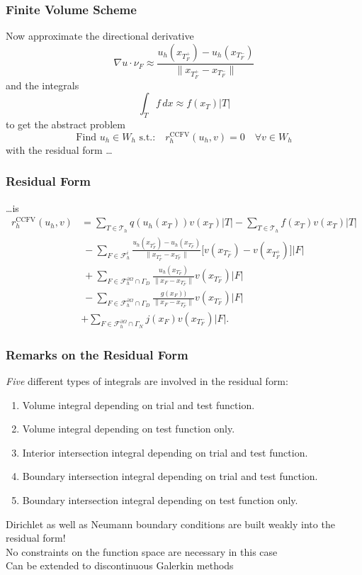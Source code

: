 \documentclass[ignorenonframetext,11pt]{beamer}
\theoremstyle{definition}
\begin{document}
\begin{frame}
\frametitle{Finite Volume Scheme}
Now approximate the directional derivative
$$\nabla u\cdot \nu_F \approx \frac{u_h(x_{T_F^+})-u_h(x_{T_F^-})}{\|x_{T_F^+} - x_{T_F^-}\|}$$
and the integrals
$$\int_T f \,dx \approx f(x_T)|T| $$
to get the abstract problem
\begin{equation}
\boxed{ \text{Find $u_h\in W_h$ s.t.:} \quad r_h^{\text{CCFV}}(u_h,v) = 0 \quad \forall v \in W_h }
\end{equation}
with the residual form \ldots
\end{frame}

\begin{frame}
\frametitle{Residual Form}
\ldots is
\begin{equation*}
\begin{split}
r_h^{\text{CCFV}}(u_h,v)
& = \sum_{T\in\mathcal{T}_h} q(u_h(x_T)) v(x_T) |T|
- \sum_{T\in\mathcal{T}_h} f(x_T) v(x_T) |T|\\
&\ - \sum_{F\in\mathcal{F}_h^i}
\frac{u_h(x_{T_F^+})-u_h(x_{T_F^-})}{\|x_{T_F^+} - x_{T_F^-}\|}
\bigl[v(x_{T_F^-}) - v(x_{T_F^+})\bigr] |F|\\
&\ + \sum_{F\in\mathcal{F}_h^{\partial\Omega}\cap\Gamma_D}
\frac{u_h(x_{T_F^-})}{\|x_{F} - x_{T_F^-}\|} v(x_{T_F^-}) |F| \\
&\ - \sum_{F\in\mathcal{F}_h^{\partial\Omega}\cap\Gamma_D}
\frac{g(x_{F}))}{\|x_{F} - x_{T_F^-}\|} v(x_{T_F^-}) |F| \\
&+ \sum_{F\in\mathcal{F}_h^{\partial\Omega}\cap\Gamma_N} j(x_{F}) v(x_{T_F^-}) |F| .
\end{split}
\end{equation*}
\end{frame}

\begin{frame}
\frametitle{Remarks on the Residual Form}
\textit{Five} different types of integrals are involved in the
residual form:
\begin{enumerate}
\item Volume integral depending on trial and test function.
\item Volume integral depending on test function only.
\item Interior intersection integral depending on trial and test function.
\item Boundary intersection integral depending on trial and test function.
\item Boundary intersection integral depending on test function only.
\end{enumerate}
Dirichlet as well as Neumann boundary conditions are built weakly into the
residual form!\\
\medskip
No constraints on the function space are necessary in this case\\
\medskip
Can be extended to discontinuous Galerkin methods
\end{frame}
\end{document}
